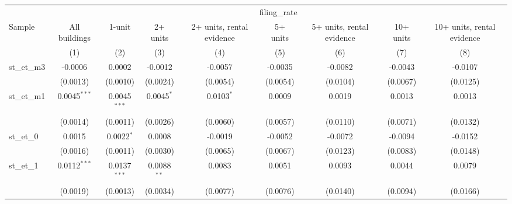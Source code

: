 \documentclass[
  11pt,
]{article}
\begin{document}
\scriptsize
\begin{adjustbox}{max width=\textwidth}

\begingroup
\centering
\begin{tabular}{lcccccccc}
   \toprule
    & \multicolumn{8}{c}{filing\_rate}\\
   Sample                     & All buildings         & 1-unit         & 2+ units              & 2+ units, rental evidence & 5+ units      & 5+ units, rental evidence & 10+ units     & 10+ units, rental evidence \\   
                              & (1)                   & (2)            & (3)                   & (4)                       & (5)           & (6)                       & (7)           & (8)\\  
   \midrule 
   st\_et\_m3                 & -0.0006               & 0.0002         & -0.0012               & -0.0057                   & -0.0035       & -0.0082                   & -0.0043       & -0.0107\\   
                              & (0.0013)              & (0.0010)       & (0.0024)              & (0.0054)                  & (0.0054)      & (0.0104)                  & (0.0067)      & (0.0125)\\   
   st\_et\_m1                 & 0.0045$^{***}$        & 0.0045$^{***}$ & 0.0045$^{*}$          & 0.0103$^{*}$              & 0.0009        & 0.0019                    & 0.0013        & 0.0013\\   
                              & (0.0014)              & (0.0011)       & (0.0026)              & (0.0060)                  & (0.0057)      & (0.0110)                  & (0.0071)      & (0.0132)\\   
   st\_et\_0                  & 0.0015                & 0.0022$^{*}$   & 0.0008                & -0.0019                   & -0.0052       & -0.0072                   & -0.0094       & -0.0152\\   
                              & (0.0016)              & (0.0011)       & (0.0030)              & (0.0065)                  & (0.0067)      & (0.0123)                  & (0.0083)      & (0.0148)\\   
   st\_et\_1                  & 0.0112$^{***}$        & 0.0137$^{***}$ & 0.0088$^{**}$         & 0.0083                    & 0.0051        & 0.0093                    & 0.0044        & 0.0079\\   
                              & (0.0019)              & (0.0013)       & (0.0034)              & (0.0077)                  & (0.0076)      & (0.0140)                  & (0.0094)      & (0.0166)\\   

\end{tabular}
\end{adjustbox}
\end{document}
